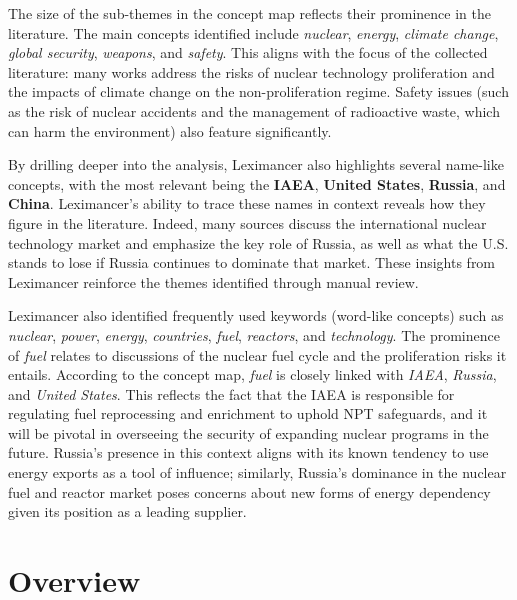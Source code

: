 \documentclass[11,5 pt]{article}
\begin{document}
The size of the sub-themes in the concept map reflects their prominence in the literature. The main concepts identified include \textit{nuclear}, \textit{energy}, \textit{climate change}, \textit{global security}, \textit{weapons}, and \textit{safety}. This aligns with the focus of the collected literature: many works address the risks of nuclear technology proliferation and the impacts of climate change on the non-proliferation regime. Safety issues (such as the risk of nuclear accidents and the management of radioactive waste, which can harm the environment) also feature significantly.

By drilling deeper into the analysis, Leximancer also highlights several name-like concepts, with the most relevant being the \textbf{IAEA}, \textbf{United States}, \textbf{Russia}, and \textbf{China}. Leximancer’s ability to trace these names in context reveals how they figure in the literature. Indeed, many sources discuss the international nuclear technology market and emphasize the key role of Russia, as well as what the U.S. stands to lose if Russia continues to dominate that market. These insights from Leximancer reinforce the themes identified through manual review.

Leximancer also identified frequently used keywords (word-like concepts) such as \textit{nuclear}, \textit{power}, \textit{energy}, \textit{countries}, \textit{fuel}, \textit{reactors}, and \textit{technology}. The prominence of \textit{fuel} relates to discussions of the nuclear fuel cycle and the proliferation risks it entails. According to the concept map, \textit{fuel} is closely linked with \textit{IAEA}, \textit{Russia}, and \textit{United States}. This reflects the fact that the IAEA is responsible for regulating fuel reprocessing and enrichment to uphold NPT safeguards, and it will be pivotal in overseeing the security of expanding nuclear programs in the future. Russia’s presence in this context aligns with its known tendency to use energy exports as a tool of influence; similarly, Russia’s dominance in the nuclear fuel and reactor market poses concerns about new forms of energy dependency given its position as a leading supplier.


\section{Overview}
\end{document}
